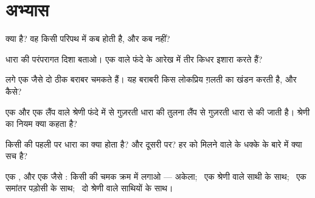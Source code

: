 \section{अभ्यास}

\begin{exercise}[$\star$]\label{exo:g7:circuits-series-parallel:1}
 क्या है? वह किसी परिपथ में कब होती है, और कब नहीं?
\end{exercise}

\begin{exercise}[$\star$]\label{exo:g7:circuits-series-parallel:2}
धारा की परंपरागत दिशा बताओ। एक  वाले फंदे के आरेख में तीर किधर
इशारा करते हैं?
\end{exercise}

\begin{exercise}[$\star$]\label{exo:g7:circuits-series-parallel:3}
 लगे एक जैसे दो  ठीक बराबर चमकते हैं। यह बराबरी किस
लोकप्रिय ग़लती का खंडन करती है, और कैसे?
\end{exercise}

\begin{exercise}[$\star$]\label{exo:g7:circuits-series-parallel:4}
एक  और एक लैंप वाले श्रेणी फंदे में  से गुज़रती धारा की तुलना
लैंप से गुज़रती धारा से की जाती है। श्रेणी का नियम क्या कहता है?
\end{exercise}

\begin{exercise}[$\star$]\label{exo:g7:circuits-series-parallel:5}
किसी  की पहली  पर धारा का क्या होता है? और दूसरी पर?
हर  को मिलने वाले  के धक्के के बारे में क्या सच है?
\end{exercise}

\begin{exercise}[$\star$]\label{exo:g7:circuits-series-parallel:6}
एक , और एक जैसे : किसी  की चमक क्रम में लगाओ --- अकेला;
\ एक श्रेणी वाले साथी के साथ; \ एक समांतर पड़ोसी के साथ; \ दो श्रेणी
वाले साथियों के साथ।
\end{exercise}

